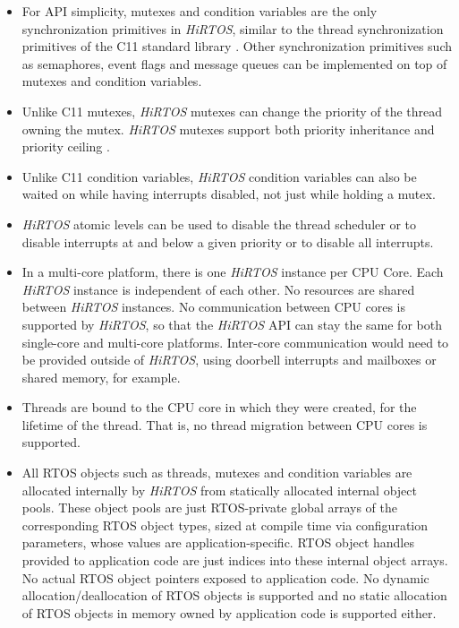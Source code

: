 \documentclass[11pt,letterpaper,twoside,openany]{book}
\begin{document}
\begin{itemize}
\item For API simplicity, mutexes and condition variables \cite{threads1, threads2} are the only
synchronization primitives in \emph{HiRTOS}, similar to the thread synchronization primitives of
the C11 standard library \cite{libcThreads}.
Other synchronization primitives such as semaphores, event flags and message queues can be
implemented on top of mutexes and condition variables.

\item Unlike C11 mutexes, \emph{HiRTOS} mutexes can change the priority of the thread owning the
mutex. \emph{HiRTOS} mutexes support both priority inheritance and priority ceiling \cite{prioCeiling}.

\item Unlike C11 condition variables, \emph{HiRTOS} condition variables
can also be waited on while having interrupts disabled, not just while holding a mutex.

\item \emph{HiRTOS} atomic levels can be used to disable the thread scheduler or to disable interrupts
at and below a given priority or to disable all interrupts.

\item In a multi-core platform, there is one \emph{HiRTOS} instance per CPU Core. Each \emph{HiRTOS} instance is
independent of each other. No resources are shared between \emph{HiRTOS} instances. No communication between
CPU cores is supported by \emph{HiRTOS}, so that the \emph{HiRTOS} API can stay the same for both single-core
and multi-core platforms. Inter-core communication would need to be provided outside of \emph{HiRTOS},
using doorbell interrupts and mailboxes or shared memory, for example.

\item
Threads are bound to the CPU core in which they were created, for the lifetime of the thread. That is,
no thread migration between CPU cores is supported.

\item
All RTOS objects such as threads, mutexes and condition variables are allocated internally
by \emph{HiRTOS} from statically allocated internal object pools.
These object pools are just RTOS-private global arrays of the corresponding RTOS object types,
sized at compile time via configuration parameters, whose values are application-specific.
RTOS object handles provided to application code are just indices into these internal object arrays.
No actual RTOS object pointers exposed to application code.
No dynamic allocation/deallocation of RTOS objects is supported and no static allocation of RTOS
objects in memory owned by application code is supported either.


\end{itemize}
\end{document}
